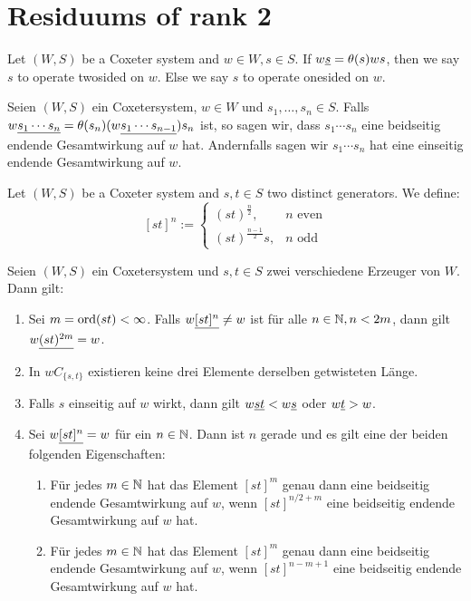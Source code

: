 \section{Residuums of rank 2}

\begin{defi}
	Let $(W,S)$ be a Coxeter system and $w \in W, s \in S$. If $w \underline{s} = \theta(s)ws$,
	then we say $s$ to operate twosided on $w$. Else we say $s$ to operate onesided
	on $w$.
\end{defi}

\begin{defi}
Seien $(W,S)$ ein Coxetersystem, $w \in W$ und $s_1,\ldots,s_n \in S$. Falls $w
\underline{s_1 \cdots s_n} = \theta(s_n)(w \underline{s_1 \cdots s_{n-1}}) s_n$ ist, so
sagen wir, dass $s_1 \cdots s_n$ eine beidseitig endende Gesamtwirkung auf
$w$ hat. Andernfalls sagen wir $s_1 \cdots s_n$ hat eine einseitig endende
Gesamtwirkung auf $w$.
\end{defi}

\begin{defi}
Let $(W,S)$ be a Coxeter system and $s,t \in S$ two distinct generators.
We define:
$$[st]^n :=
\begin{cases}
(st)^{\frac{n}{2}}, & n \textrm{ even} \\
(st)^{\frac{n-1}{2}}s, & n \textrm{ odd} 
\end{cases}$$
\end{defi}

\begin{assu}
Seien $(W,S)$ ein Coxetersystem und $s,t \in S$ zwei verschiedene Erzeuger
von $W$. Dann gilt:
\begin{enumerate}
	\item \label{max-twocycle-length} Sei $m = \operatorname{ord} (st) < \infty$. Falls
	$w \underline{[st]^n} \neq w$ ist für alle $n \in \mathbb{N}, n < 2m$, dann gilt $w \underline{(st)^{2m}} = w$.
	\item \label{twocycle-is-convex} In $wC_{\{s,t\}}$ existieren keine drei
	Elemente derselben getwisteten Länge.
	\item \label{onesided-operations-only-at-top-or-bottom-end-of-twocycle}
	Falls $s$ einseitig auf $w$ wirkt, dann gilt $w \underline{st} < w \underline{s}$ oder $w
	\underline{t} > w$.
	\item \label{twocycle-symmetry} Sei $w \underline{[st]^n} = w$ für ein $n \in
	\mathbb{N}$. Dann ist $n$ gerade und es gilt eine der beiden folgenden Eigenschaften:
		\begin{enumerate}
			\item Für jedes $m \in \mathbb{N}$ hat das Element $[st]^m$ genau dann eine
			beidseitig endende Gesamt\-wirkung auf $w$, wenn $[st]^{n/2+m}$ eine
			beidseitig endende Gesamtwirkung auf $w$ hat.
			\item Für jedes $m \in \mathbb{N}$ hat das Element $[st]^m$ genau dann eine
			beidseitig endende Gesamt\-wirkung auf $w$, wenn $[st]^{n-m+1}$ eine
			beidseitig endende Gesamtwirkung auf $w$ hat.
		\end{enumerate}
\end{enumerate}
\end{assu}

